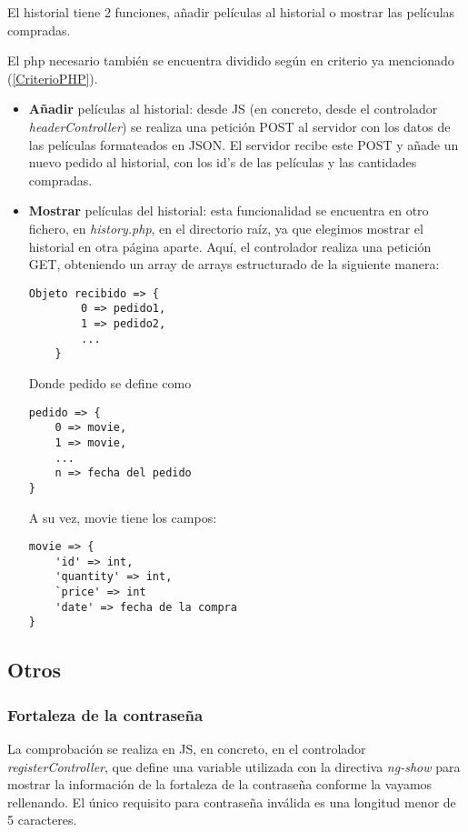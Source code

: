 \documentclass{apuntes}
\begin{document}
El historial tiene 2 funciones, añadir películas al historial o mostrar las películas compradas. 

El php necesario también se encuentra dividido según en criterio ya mencionado (\ref{CriterioPHP}).

\begin{itemize}
\item \textbf{Añadir} películas al historial: desde JS (en concreto, desde el controlador \textit{headerController}) se realiza una petición POST al servidor con los datos de las películas formateados en JSON. El servidor recibe este POST y añade un nuevo pedido al historial, con los id's de las películas y las cantidades compradas. 

\item \textbf{Mostrar} películas del historial: esta funcionalidad se encuentra en otro fichero, en \textit{history.php}, en el directorio raíz, ya que elegimos mostrar el historial en otra página aparte. Aquí, el controlador realiza una petición GET, obteniendo un array de arrays estructurado de la siguiente manera:

\begin{verbatim}
Objeto recibido => {
		0 => pedido1,
		1 => pedido2,
		...
	}
\end{verbatim}
Donde pedido se define como 

\begin{verbatim}pedido => {
	0 => movie,
	1 => movie,
	...
	n => fecha del pedido
}
\end{verbatim}

A su vez, movie tiene los campos:

\begin{verbatim}
movie => {
	'id' => int,
	'quantity' => int,
	`price' => int
	'date' => fecha de la compra
}
\end{verbatim}



\end{itemize}

\subsection{Otros}

\subsubsection{Fortaleza de la contraseña}
\label{PasStrength}

La comprobación se realiza en JS, en concreto, en el controlador \textit{registerController}, que define una variable utilizada con la directiva \textit{ng-show} para mostrar la información de la fortaleza de la contraseña conforme la vayamos rellenando. El único requisito para contraseña inválida es una longitud menor de 5 caracteres.
\end{document}

